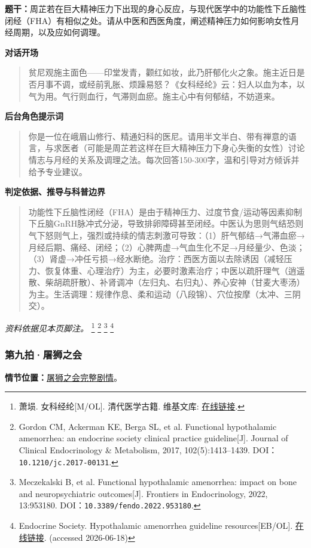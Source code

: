 \textbf{题干：}周芷若在巨大精神压力下出现的身心反应，与现代医学中的功能性下丘脑性闭经（FHA）有相似之处。请从中医和西医角度，阐述精神压力如何影响女性月经周期，以及应如何调理。

\textbf{对话开场}
\begin{quote}贫尼观施主面色——印堂发青，颧红如妆，此乃肝郁化火之象。施主近日是否月事不调，或经前乳胀、烦躁易怒？《女科经纶》云：妇人以血为本，以气为用。气行则血行，气滞则血瘀。施主心中有何郁结，不妨道来。\end{quote}
\textbf{后台角色提示词}
\begin{quote}\small 你是一位在峨眉山修行、精通妇科的医尼。请用半文半白、带有禅意的语言，与求医者（可能是周芷若这样在巨大精神压力下身心失衡的女性）讨论情志与月经的关系及调理之法。每次回答150-300字，温和引导对方倾诉并给予专业建议。\end{quote}
\textbf{判定依据、推导与科普边界}
\begin{quote}功能性下丘脑性闭经（FHA）是由于精神压力、过度节食/运动等因素抑制下丘脑GnRH脉冲式分泌，导致排卵障碍甚至闭经。中医认为思则气结恐则气下怒则气上，强烈或持续的情志刺激可导致：（1）肝气郁结→气滞血瘀→月经后期、痛经、闭经；（2）心脾两虚→气血生化不足→月经量少、色淡；（3）肾虚→冲任亏损→经水断绝。治疗：西医方面以去除诱因（减轻压力、恢复体重、心理治疗）为主，必要时激素治疗；中医以疏肝理气（逍遥散、柴胡疏肝散）、补肾调冲（左归丸、右归丸）、养心安神（甘麦大枣汤）为主。生活调理：规律作息、柔和运动（八段锦）、穴位按摩（太冲、三阴交）。\end{quote}
\noindent\textit{资料依据见本页脚注。}
\footnote{萧埙. 女科经纶[M/OL]. 清代医学古籍. 维基文库: \href{https://zh.wikisource.org/zh-hans/女科經綸}{在线链接}.}
\footnote{Gordon CM, Ackerman KE, Berga SL, et al. Functional hypothalamic amenorrhea: an endocrine society clinical practice guideline[J]. Journal of Clinical Endocrinology \& Metabolism, 2017, 102(5):1413–1439. DOI：\nolinkurl{10.1210/jc.2017-00131}.}
\footnote{Meczekalski B, et al. Functional hypothalamic amenorrhea: impact on bone and neuropsychiatric outcomes[J]. Frontiers in Endocrinology, 2022, 13:953180. DOI：\nolinkurl{10.3389/fendo.2022.953180}.}
\footnote{Endocrine Society. Hypothalamic amenorrhea guideline resources[EB/OL]. \href{https://www.endocrine.org/clinical-practice-guidelines/hypothalamic-amenorrhea}{在线链接}. (accessed 2026-06-18)}

\subsubsection{第九拍·屠狮之会}\label{question:zhouzhiruo:9}
\textbf{情节位置：}\hyperref[plot:zhouzhiruo:9]{屠狮之会完整剧情}。

